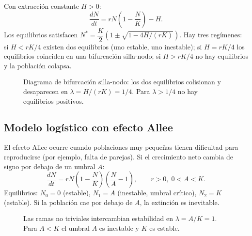\documentclass[11pt,letterpaper]{article}
\begin{document}
Con extracción constante $H>0$:
\[
\frac{dN}{dt}=rN\!\left(1-\frac{N}{K}\right)-H.
\]
Los equilibrios satisfacen $N^*=\dfrac{K}{2}\!\left(1\pm\sqrt{1-4H/(rK)}\right)$.
Hay tres regímenes: si $H<rK/4$ existen dos equilibrios (uno estable, uno
inestable); si $H=rK/4$ los equilibrios coinciden en una bifurcación silla-nodo;
si $H>rK/4$ no hay equilibrios y la población colapsa.

\begin{figure}[H]
\centering
{}
\caption{Diagrama de bifurcación silla-nodo: los dos equilibrios colisionan y desaparecen
en $\lambda=H/(rK)=1/4$. Para $\lambda>1/4$ no hay equilibrios positivos.}
\end{figure}

\subsection{Modelo logístico con efecto Allee}

El efecto Allee ocurre cuando poblaciones muy pequeñas tienen dificultad para
reproducirse (por ejemplo, falta de parejas). Si el crecimiento neto cambia
de signo por debajo de un umbral $A$:
\[
\frac{dN}{dt}=rN\!\left(1-\frac{N}{K}\right)\!\left(\frac{N}{A}-1\right),
\qquad r>0,\; 0<A<K.
\]
Equilibrios: $N_0=0$ (estable), $N_1=A$ (inestable, umbral crítico), $N_2=K$ (estable).
Si la población cae por debajo de $A$, la extinción es inevitable.

\begin{figure}[H]
\centering
{}
\caption{Las ramas no triviales intercambian estabilidad en $\lambda=A/K=1$.
         Para $A<K$ el umbral $A$ es inestable y $K$ es estable.}
\end{figure}
\end{document}
